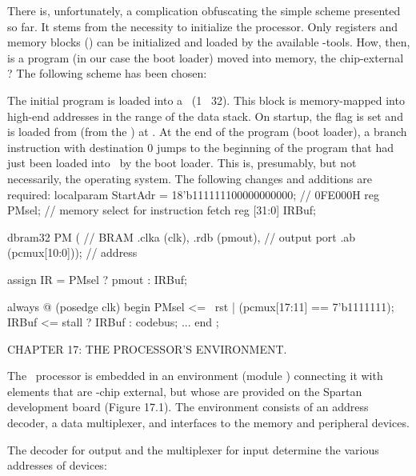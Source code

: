 {\noindent There is, unfortunately, a complication obfuscating the simple scheme presented so far. It stems from the necessity to initialize the processor. Only registers and memory blocks (\BRAM) can be initialized and loaded by the available \FPGA-tools. How, then, is a program (in our case the boot loader) moved into memory, the chip-external \SRAM? The following scheme has been chosen:

The initial program is loaded into a \BRAM\ (1 \times\ 32). This block is memory-mapped into high-end addresses in the range of the data stack. On startup, the flag  is set and  is loaded from  (from the \BRAM) at . At the end of the program (boot loader), a branch instruction with destination 0 jumps to the beginning of the program that had just been loaded into \SRAM\ by the boot loader. This is, presumably, but not necessarily, the operating system. The following changes and additions are required:
\begintt
localparam StartAdr = 18'b111111100000000000; // 0FE000H
reg PMsel; // memory select for instruction fetch
reg [31:0] IRBuf;

dbram32 PM ( // BRAM
  .clka (clk),
  .rdb (pmout), // output port
  .ab (pcmux[10:0])); // address

assign IR = PMsel ? pmout : IRBuf;

always @ (posedge clk) begin
  PMsel <= ~rst | (pcmux[17:11] == 7'b1111111);
  IRBuf <= stall ? IRBuf : codebus;
  ...
end ;
\endtt

\beginchapter CHAPTER 17: THE PROCESSOR'S ENVIRONMENT.

The \RISC\ processor is embedded in an environment (module ) connecting it with elements that are \FPGA-chip external, but whose are provided on the Spartan development board (Figure 17.1). The environment consists of an address decoder, a data multiplexer, and interfaces to the memory and peripheral devices.


The decoder for output and the multiplexer for input determine the various addresses of devices:

\medskip
{}\medskip

}
